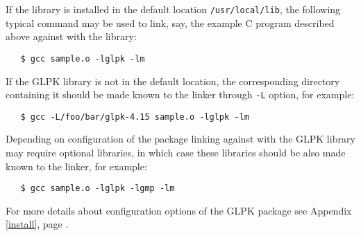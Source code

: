If the library is installed in the default
location \verb|/usr/local/lib|, the following typical command may be
used to link, say, the example C program described above against with
the library:

\begin{verbatim}
   $ gcc sample.o -lglpk -lm
\end{verbatim}

If the GLPK library is not in the default location, the corresponding
directory containing it should be made known to the linker through
\verb|-L| option, for example:

\begin{verbatim}
   $ gcc -L/foo/bar/glpk-4.15 sample.o -lglpk -lm
\end{verbatim}

Depending on configuration of the package linking against with the GLPK
library may require optional libraries, in which case these libraries
should be also made known to the linker, for example:

\begin{verbatim}
   $ gcc sample.o -lglpk -lgmp -lm
\end{verbatim}

For more details about configuration options of the GLPK package see
Appendix \ref{install}, page \pageref{install}.

